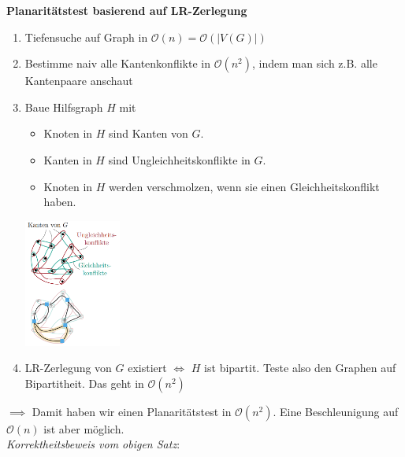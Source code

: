 \textbf{Planaritätstest basierend auf LR-Zerlegung}
\begin{enumerate}
	\item Tiefensuche auf Graph in $\mathcal{O}(n)=\mathcal{O}(|V(G)|)$
	\item Bestimme naiv alle Kantenkonflikte in $\mathcal{O}(n^2)$, indem man sich z.B. alle Kantenpaare anschaut
	\item Baue Hilfsgraph $H$ mit
	\begin{itemize}
		\item Knoten in $H$ sind Kanten von $G$.
		\item Kanten in $H$ sind Ungleichheitskonflikte in $G$.
		\item Knoten in $H$ werden verschmolzen, wenn sie einen Gleichheitskonflikt haben.
	\end{itemize}
	\begin{center}
		\includegraphics[width=0.25\textwidth]{images/planar-test.png}
	\end{center}
	\item LR-Zerlegung von $G$ existiert $\iff$ $H$ ist bipartit. Teste also den Graphen auf Bipartitheit. Das geht in $\mathcal{O}(n^2)$
\end{enumerate}
$\implies$ Damit haben wir einen Planaritätstest in $\mathcal{O}(n^2)$. Eine Beschleunigung auf $\mathcal{O}(n)$ ist aber möglich.\\

\textit{Korrektheitsbeweis vom obigen Satz}:

